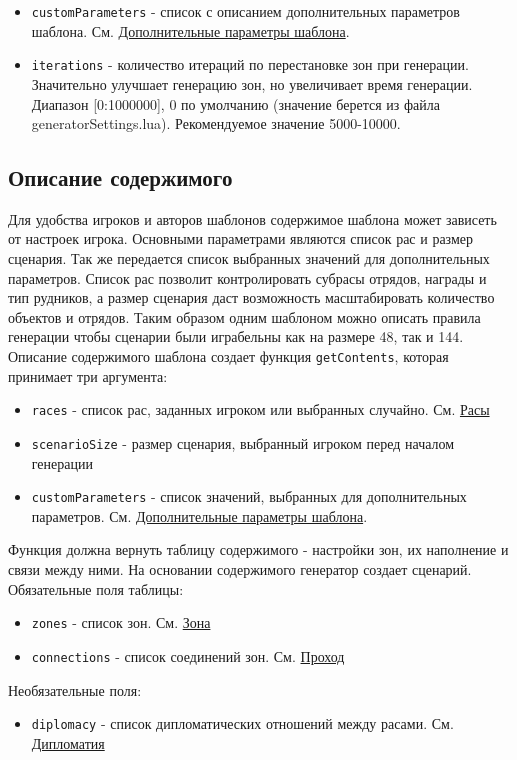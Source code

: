\begin{itemize}
\item \texttt{customParameters} - список с описанием дополнительных параметров шаблона. См. \hyperref[customParameters]{Дополнительные параметры шаблона}.

\item \texttt{iterations} - количество итераций по перестановке зон при генерации. Значительно улучшает генерацию зон, но увеличивает время генерации. Диапазон [0:1000000], 0 по умолчанию (значение берется из файла generatorSettings.lua). Рекомендуемое значение 5000-10000.
\end{itemize}

\subsection{Описание содержимого}
\label{contentsTable}
Для удобства игроков и авторов шаблонов содержимое шаблона может зависеть от настроек игрока. Основными параметрами являются список рас и размер сценария.
Так же передается список выбранных значений для дополнительных параметров.
Список рас позволит контролировать субрасы отрядов, награды и тип рудников, а размер сценария даст возможность масштабировать количество объектов и отрядов.
Таким образом одним шаблоном можно описать правила генерации чтобы сценарии были играбельны как на размере 48, так и 144.\\
Описание содержимого шаблона создает функция \texttt{getContents}, которая принимает три аргумента:
\begin{itemize}
\item \texttt{races} - список рас, заданных игроком или выбранных случайно. См. \hyperref[raceTypes]{Расы}
\item \texttt{scenarioSize} - размер сценария, выбранный игроком перед началом генерации
\item \texttt{customParameters} - список значений, выбранных для дополнительных параметров. См. \hyperref[customParameters]{Дополнительные параметры шаблона}.
\end{itemize}
Функция должна вернуть таблицу содержимого - настройки зон, их наполнение и связи между ними. На основании содержимого генератор создает сценарий.\\
Обязательные поля таблицы:
\begin{itemize}
\item \texttt{zones} - список зон. См. \hyperref[zone]{Зона}
\item \texttt{connections} - список соединений зон. См. \hyperref[connection]{Проход}
\end{itemize}
Необязательные поля:
\begin{itemize}
\item \texttt{diplomacy} - список дипломатических отношений между расами. См. \hyperref[diplomacy]{Дипломатия}
\end{itemize}

